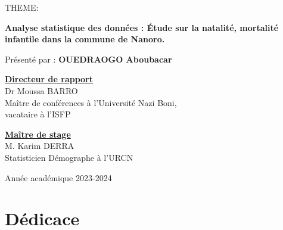 \documentclass[12pt,a4paper]{report}
\begin{document}
	\begin{center}
		\large{THEME:}\normalsize\\
		
		\begin{tcolorbox}[colback=moncolor, colframe=moncolor, width=1\textwidth, boxrule=0.6mm, arc=1mm ]
			\centering
			\textbf{\Large{Analyse statistique des données : Étude sur la natalité, mortalité infantile dans la commune de Nanoro.}}
		\end{tcolorbox}
	\end{center}
	\begin{center}
		Présenté par : \textbf{OUEDRAOGO Aboubacar}
	\end{center}
	
	\begin{minipage}{0.65\textwidth}
		\textbf{\underline{Directeur de rapport}}\\
		Dr Moussa BARRO\\
		Maître de conférences à l’Université Nazi Boni,\\
		vacataire à l'ISFP
	\end{minipage}
	\begin{minipage}{0.4\textwidth}
		\textbf{\underline{Maître de stage}}\\
		M. Karim DERRA\\
		Statisticien Démographe à l'URCN
	\end{minipage}
	
	\vspace{1.5cm}
	\begin{center}
		Année académique 2023-2024
	\end{center}
	
	\thispagestyle{empty}
	

		\newpage
	
	\renewcommand{\thepage}{\small\roman{page}}
	
	\chapter*{Dédicace}       %
	
	\vspace*{5cm}  %
\end{document}
